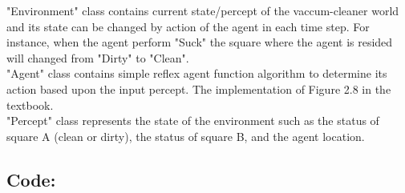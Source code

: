 \documentclass[a4paper]{article}
\begin{document}
"Environment" class contains current state/percept of the vaccum-cleaner world and its state can be changed by action of the agent in each time step. For instance, when the agent perform "Suck" the square where the agent is resided will changed from "Dirty" to "Clean". \\

"Agent" class contains simple reflex agent function algorithm to determine its action based upon the input percept. The implementation of 
Figure 2.8 in the textbook. \\

"Percept" class represents the state of the environment such as the status of square A (clean or dirty), the status of square B, and the agent location. \\

\subsection*{Code:}





\end{document}
